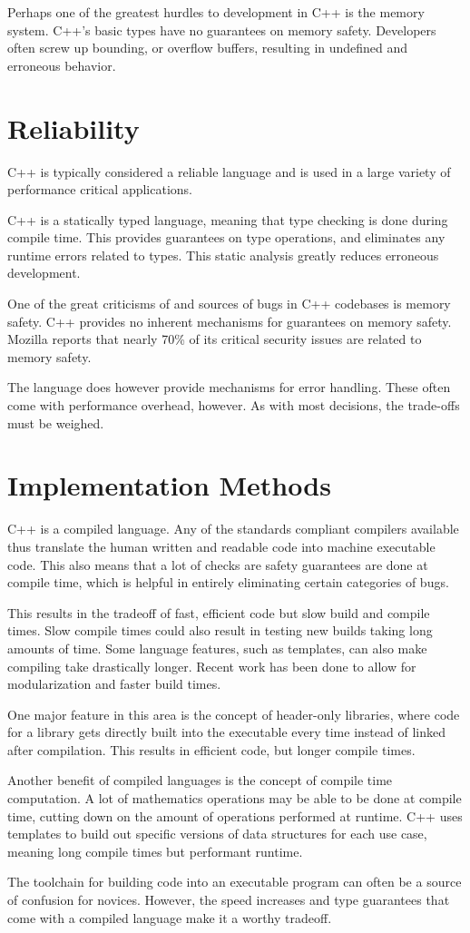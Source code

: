 \documentclass[12pt]{article}
\begin{document}
Perhaps one of the greatest hurdles to development in C++ is the memory system.
C++'s basic types have no guarantees on memory safety.
Developers often screw up bounding, or overflow buffers, resulting in undefined and erroneous behavior.


\section{Reliability}

C++ is typically considered a reliable language and is used in a large variety of performance critical applications.

C++ is a statically typed language, meaning that type checking is done during compile time.
This provides guarantees on type operations, and eliminates any runtime errors related to types.
This static analysis greatly reduces erroneous development.

One of the great criticisms of and sources of bugs in C++ codebases is memory safety.
C++ provides no inherent mechanisms for guarantees on memory safety.
Mozilla reports that nearly 70\% of its critical security issues are related to memory safety.

The language does however provide mechanisms for error handling.
These often come with performance overhead, however.
As with most decisions, the trade-offs must be weighed.


\section{Implementation Methods}

C++ is a compiled language.
Any of the standards compliant compilers available thus translate the human written and readable code into machine executable code.
This also means that a lot of checks are safety guarantees are done at compile time, which is helpful in entirely eliminating certain categories of bugs.

This results in the tradeoff of fast, efficient code but slow build and compile times.
Slow compile times could also result in testing new builds taking long amounts of time.
Some language features, such as templates, can also make compiling take drastically longer.
Recent work has been done to allow for modularization and faster build times.

One major feature in this area is the concept of header-only libraries, where code for a library gets directly built into the executable every time instead of linked after compilation.
This results in efficient code, but longer compile times.

Another benefit of compiled languages is the concept of compile time computation.
A lot of mathematics operations may be able to be done at compile time, cutting down on the amount of operations performed at runtime.
C++ uses templates to build out specific versions of data structures for each use case, meaning long compile times but performant runtime.

The toolchain for building code into an executable program can often be a source of confusion for novices.
However, the speed increases and type guarantees that come with a compiled language make it a worthy tradeoff.
\end{document}
